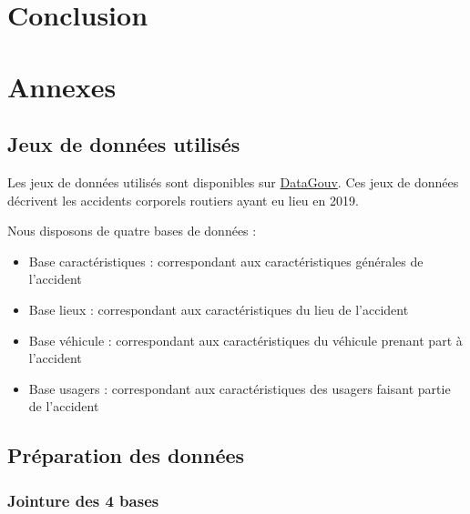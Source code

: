 \documentclass[french,]{tp}
\providecommand{\tightlist}{%
  \setlength{\itemsep}{0pt}\setlength{\parskip}{0pt}}
\begin{document}
\newpage

\hypertarget{conclusion}{%
\section{Conclusion}\label{conclusion}}

\newpage

\hypertarget{appendix-annexes}{%
\appendix}


\hypertarget{annexes}{%
\section{Annexes}\label{annexes}}

\hypertarget{jeux-de-donnuxe9es-utilisuxe9s}{%
\subsection{Jeux de données utilisés}\label{jeux-de-donnuxe9es-utilisuxe9s}}

Les jeux de données utilisés sont disponibles sur \href{https://www.data.gouv.fr/fr/datasets/bases-de-donnees-annuelles-des-accidents-corporels-de-la-circulation-routiere-annees-de-2005-a-2019/}{DataGouv}. Ces jeux de données décrivent les accidents corporels routiers ayant eu lieu en 2019.

Nous disposons de quatre bases de données :

\begin{itemize}
\tightlist
\item
  Base caractéristiques : correspondant aux caractéristiques générales de l'accident
\item
  Base lieux : correspondant aux caractéristiques du lieu de l'accident
\item
  Base véhicule : correspondant aux caractéristiques du véhicule prenant part à l'accident
\item
  Base usagers : correspondant aux caractéristiques des usagers faisant partie de l'accident
\end{itemize}

\hypertarget{pruxe9paration-des-donnuxe9es}{%
\subsection{Préparation des données}\label{pruxe9paration-des-donnuxe9es}}

\hypertarget{jointure-des-4-bases}{%
\subsubsection{Jointure des 4 bases}\label{jointure-des-4-bases}}
\end{document}
